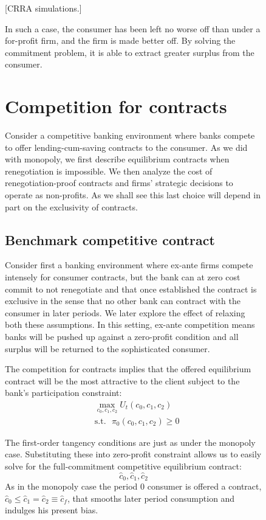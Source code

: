 \documentclass[11pt]{article}%
\begin{document}
\begin{figure}
{[CRRA simulations.]

In such a case, the consumer has been left no worse off than under a
for-profit firm, and the firm is made better off. By solving the commitment
problem, it is able to extract greater surplus from the consumer.

\section{Competition for contracts}

Consider a competitive banking environment where banks compete to offer
lending-cum-saving contracts to the consumer.  As we did with monopoly, we first describe equilibrium contracts when
renegotiation is impossible. We then analyze the cost of renegotiation-proof contracts and firms' strategic decisions to operate as
non-profits. As we shall see this last choice will depend in part on the exclusivity of contracts.




 
 




\subsection{Benchmark competitive contract}

Consider first a banking environment where  ex-ante firms compete intensely for consumer contracts, but the bank can at zero cost commit to not renegotiate and that once established the  contract is exclusive in the sense that no other
bank can contract with the consumer in later periods. We later explore the effect of relaxing both these assumptions. In this  setting,   ex-ante competition means banks will be pushed up against a zero-profit condition
and all surplus will be returned to
the sophisticated consumer.

The competition for contracts implies that the  offered equilibrium contract will be the most attractive  to the client subject to the bank's participation constraint:%
\begin{align*}
&  \max_{c_{0},c_{1},c_{2}}U_{t}\left(  c_{0},c_{1},c_{2}\right) \\
&  \text{s}\text{.t}\text{.}\text{ }\pi_{0}\left(  c_{0},c_{1},c_{2}\right)
\geq0
\end{align*}


The first-order tangency conditions are just as under the monopoly case. Substituting these into
zero-profit constraint allows us to easily solve for the full-commitment competitive equilibrium contract:%
\[
\hat{c}_{0},\hat{c}_{1},\hat{c}_{2}%
\]
As in the monopoly case the period 0 consumer is offered a contract, 
\(\hat{c}_{0}\leq\hat{c}_{1}=\hat{c}_{2}\equiv\hat{c}_{f}\), that smooths later period consumption and indulges his present bias. 

}
\end{figure}
\end{document}
